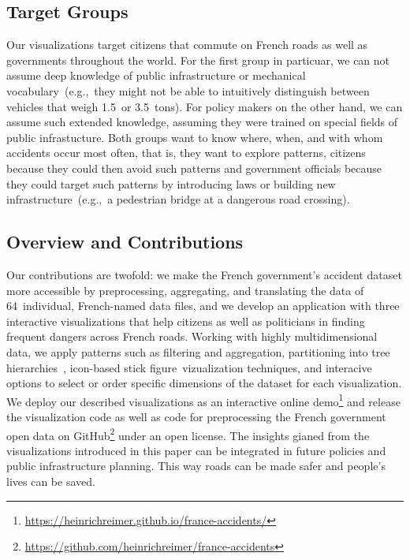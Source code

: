 \subsection{Target Groups}
Our visualizations target citizens that commute on French roads as well as governments throughout the world. For the first group in particuar, we can not assume deep knowledge of public infrastructure or mechanical vocabulary~(e.g.,~they might not be able to intuitively distinguish between vehicles that weigh 1.5~or 3.5~tons). For policy makers on the other hand, we can assume such extended knowledge, assuming they were trained on special fields of public infrastucture. Both groups want to know where, when, and with whom accidents occur most often, that is, they want to explore patterns, citizens because they could then avoid such patterns and government officials because they could target such patterns by introducing laws or building new infrastructure~(e.g.,~a pedestrian bridge at a dangerous road crossing). 

\subsection{Overview and Contributions}
Our contributions are twofold: \Ni we make the French government's accident dataset more accessible by preprocessing, aggregating, and translating the data of 64~individual, French-named data files, and \Ni we develop an application with three interactive visualizations that help citizens as well as politicians in finding frequent dangers across French roads.
Working with highly multidimensional data, we apply patterns such as filtering and aggregation, partitioning into tree hierarchies~\todocite{}, icon-based stick figure~\todocite vizualization techniques, and interacive options to select or order specific dimensions of the dataset for each visualization.
We deploy our described visualizations as an interactive online demo\footnote{\url{https://heinrichreimer.github.io/france-accidents/}} and release the visualization code as well as code for preprocessing the French government open data on GitHub\footnote{\url{https://github.com/heinrichreimer/france-accidents}} under an open license.
The insights gianed from the visualizations introduced in this paper can be integrated in future policies and public infrastructure planning. This way roads can be made safer and people's lives can be saved.
